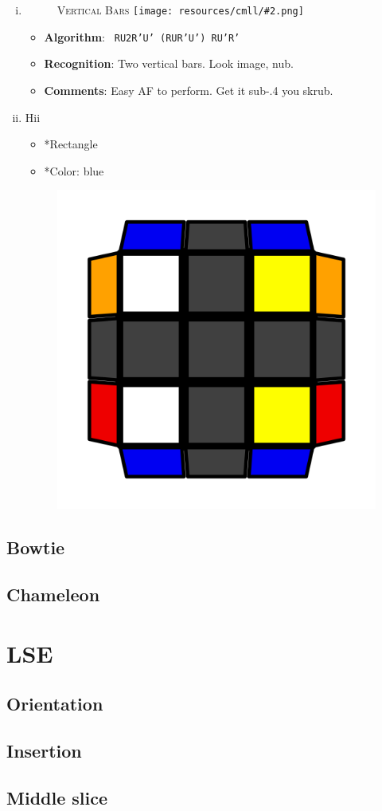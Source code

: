 \documentclass[a4paper]{scrreprt}
\newcommand{\algsheet}[5]{
	\begin{minipage}{0.45\textwidth}
	\begin{figure}[H]
	\begin{center}
	\textsc{#1}
	\texttt{[image: resources/cmll/\#2.png]}
	\end{center}
	\end{figure}
	\end{minipage} \hfill
	\begin{minipage}{0.55\textwidth}
	\begin{itemize}
	\item \textbf{Algorithm}: \texttt{#3}
	\item \textbf{Recognition}: #4
	\item \textbf{Comments}: #5
	\end{itemize}
	\end{minipage}
}
\begin{document}
\begin{enumerate}[(i)]
\item
	\algsheet{Vertical Bars}{double_headlights/vertical}{
		RU2R'U' (RUR'U') RU'R'
	}{
		Two vertical bars. Look image, nub.
	}{
		Easy AF to perform. Get it sub-.4 you skrub.
	}
\item
Hii
\begin{minipage}{0.45\textwidth}
\begin{itemize}
\item *Rectangle
\item *Color: blue
\end{itemize}
\end{minipage}
\begin{minipage}{0.5\textwidth}
\begin{figure}[H]
\includegraphics[width=\textwidth]{resources/cmll/double_headlights/vertical.png}
\end{figure}
\end{minipage} \hfill

\end{enumerate}

\subsection{Bowtie}
\subsection{Chameleon}

\section{LSE}
\subsection{Orientation}
\subsection{Insertion}
\subsection{Middle slice}
\end{document}
